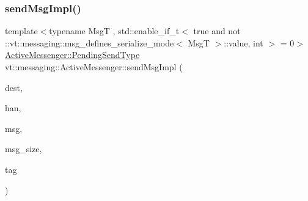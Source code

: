 \subsubsection{\texorpdfstring{send\+Msg\+Impl()}{sendMsgImpl()}\hspace{0.1cm}{\footnotesize\ttfamily [1/4]}}
{\footnotesize\ttfamily template$<$typename MsgT , std\+::enable\+\_\+if\+\_\+t$<$ true and not \+::vt\+::messaging\+::msg\+\_\+defines\+\_\+serialize\+\_\+mode$<$ Msg\+T $>$\+::value, int $>$  = 0$>$ \\
\hyperlink{structvt_1_1messaging_1_1_active_messenger_a3626a6ca76d8ad4ec7c3b47a2c70d3a8}{Active\+Messenger\+::\+Pending\+Send\+Type} vt\+::messaging\+::\+Active\+Messenger\+::send\+Msg\+Impl (\begin{DoxyParamCaption}\item[{\hyperlink{namespacevt_a866da9d0efc19c0a1ce79e9e492f47e2}{Node\+Type}}]{dest,  }\item[{\hyperlink{namespacevt_af64846b57dfcaf104da3ef6967917573}{Handler\+Type}}]{han,  }\item[{\hyperlink{structvt_1_1messaging_1_1_msg_shared_ptr}{Msg\+Shared\+Ptr}$<$ MsgT $>$ \&}]{msg,  }\item[{\hyperlink{namespacevt_aab8d55968084610ce3b17057981e9300}{Byte\+Type}}]{msg\+\_\+size,  }\item[{\hyperlink{namespacevt_a84ab281dae04a52a4b243d6bf62d0e52}{Tag\+Type}}]{tag }\end{DoxyParamCaption})\hspace{0.3cm}{\ttfamily [inline]}}

\mbox{\label{structvt_1_1messaging_1_1_active_messenger_ae4d52bd4014fe9cfee3a60bf477fe998}} 
